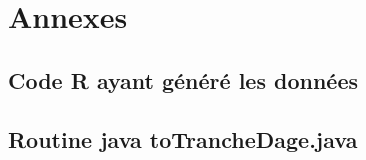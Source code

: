 \chapter{Annexes}
\section{Code R ayant généré les données}\label{generateDataR}
\lstset{language=java}
\lstset{frame=shadowbox}


\clearpage

\section{Routine java toTrancheDage.java}\label{toTrancheDage}

\lstset{language=java}
\lstset{frame=shadowbox}

